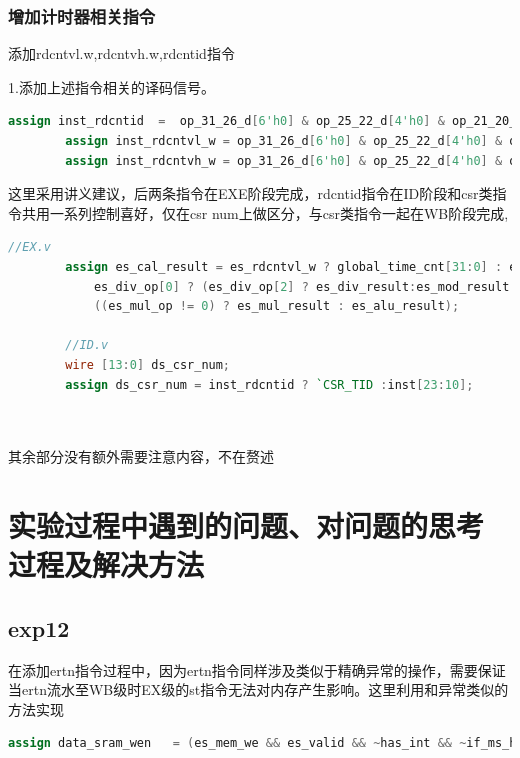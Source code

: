 \documentclass[12pt,a4paper]{article}
\newcommand*{\song}{\CJKfamily{zhsong}}
\newcommand{\sectionfont}{\song\textbf}
\begin{document}
        \subsubsection{增加计时器相关指令}
        添加rdcntvl.w,rdcntvh.w,rdcntid指令
        \par
        1.添加上述指令相关的译码信号。
        \begin{lstlisting}[language=Verilog]
        assign inst_rdcntid  =  op_31_26_d[6'h0] & op_25_22_d[4'h0] & op_21_20_d[2'h0] & op_19_15_d[5'h0] & (rk == 5'b11000) & (rd == 5'h0);
        assign inst_rdcntvl_w = op_31_26_d[6'h0] & op_25_22_d[4'h0] & op_21_20_d[2'h0] & op_19_15_d[5'h0] & (rk == 5'b11000) & (rj == 5'h0);
        assign inst_rdcntvh_w = op_31_26_d[6'h0] & op_25_22_d[4'h0] & op_21_20_d[2'h0] & op_19_15_d[5'h0] & (rk == 5'b11001) & (rj == 5'h0);
        \end{lstlisting}
        这里采用讲义建议，后两条指令在EXE阶段完成，rdcntid指令在ID阶段和csr类指令共用一系列控制喜好，仅在csr num上做区分，与csr类指令一起在WB阶段完成,
        \begin{lstlisting}[language=Verilog]
        //EX.v
        assign es_cal_result = es_rdcntvl_w ? global_time_cnt[31:0] : es_rdcntvh_w ? global_time_cnt[63:32] :
            es_div_op[0] ? (es_div_op[2] ? es_div_result:es_mod_result ):
            ((es_mul_op != 0) ? es_mul_result : es_alu_result);
            
        //ID.v
        wire [13:0] ds_csr_num;
        assign ds_csr_num = inst_rdcntid ? `CSR_TID :inst[23:10];

        
        \end{lstlisting}
        其余部分没有额外需要注意内容，不在赘述
        \par
        

\section{\sectionfont 实验过程中遇到的问题、对问题的思考过程及解决方法}
    \subsection{exp12}
    在添加ertn指令过程中，因为ertn指令同样涉及类似于精确异常的操作，需要保证当ertn流水至WB级时EX级的st指令无法对内存产生影响。这里利用和异常类似的方法实现
        \begin{lstlisting}[language=Verilog]
            assign data_sram_wen   = (es_mem_we && es_valid && ~has_int && ~if_ms_has_int && ~wb_ex && ~if_es_has_int & ~ertn_flush & ~es_ertn_flush) ? w_strb : 4'b0000;

        \end{lstlisting}
\end{document}
